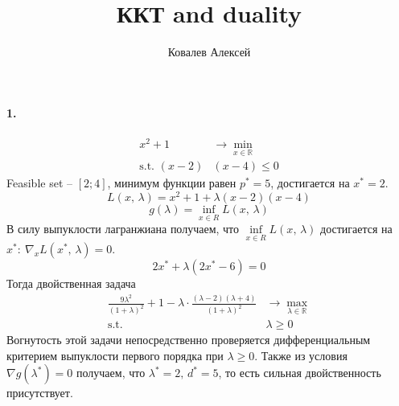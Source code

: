 \documentclass{article}
\title{ККТ and duality}
\author{Ковалев Алексей}
\date{}
\newcommand*{\R}{\mathbb{R}}
\newcommand*{\st}{\text{s.t. }}
\newcommand*{\1}{\mathbf{1}}
\begin{document}
\maketitle

\paragraph{1.}
\[ \begin{split}
    x^2 + 1 &\to \min\limits_{x \in \R} \\
    \st (x - 2)&(x - 4) \leqslant 0
\end{split} \]
Feasible set -- $[2; 4]$, минимум функции равен $p^\ast = 5$, достигается на $x^\ast = 2$.
\[ L(x,\, \lambda) = x^2 + 1 + \lambda (x - 2)(x - 4) \]
\[ g(\lambda) = \inf\limits_{x \in R} L(x,\, \lambda) \]
В силу выпуклости лагранжиана получаем, что $\inf\limits_{x \in R} L(x,\, \lambda)$ достигается на $x^\ast :\: \nabla_x L(x^\ast,\, \lambda) = 0$. 
\[ 2x^\ast + \lambda (2 x^\ast - 6) = 0 \]
Тогда двойственная задача
\[ \begin{split}
    \frac{9 \lambda^2}{(1 + \lambda)^2} + 1 - \lambda \cdot \frac{(\lambda - 2)(\lambda + 4)}{(1 + \lambda)^2} &\to \max\limits_{\lambda \in \R} \\
    \st & \lambda \geqslant 0
\end{split} \]
Вогнутость этой задачи непосредственно проверяется дифференциальным критерием выпуклости первого порядка при $\lambda \geqslant 0$. Также из условия $\nabla g(\lambda^\ast) = 0$ получаем, что $\lambda^\ast = 2,\, d^\ast = 5$, то есть сильная двойственность присутствует.
\end{document}
